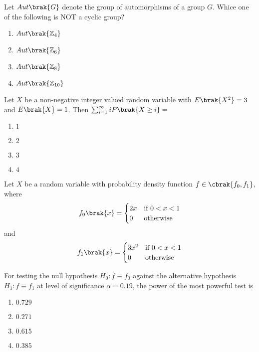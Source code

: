    \item Let $Aut\brak{G}$ denote the group of automorphisms of a group $G$. Whice one of the following is NOT a cyclic group?
	\hfill{}

	\begin{enumerate}
		\item $Aut\brak{\mathbb{Z}_4}$
		\item $Aut\brak{\mathbb{Z}_6}$
		\item $Aut\brak{\mathbb{Z}_8}$
		\item $Aut\brak{\mathbb{Z}_{10}}$
	\end{enumerate}

    \item Let $X$ be a non-negative integer valued random variable with $E\brak{X^2} = 3$ and $E\brak{X} = 1$. Then $\sum_{i = 1}^{\infty} iP\brak{X \geq i} = $
	\hfill{}

	\begin{enumerate}
		\item $1$
		\item $2$
		\item $3$
		\item $4$
	\end{enumerate}

    \item Let $X$ be a random variable with probability density function $f \in \cbrak{f_0, f_1}$, where
	\begin{align*}
		f_0\brak{x} = 
		\begin{cases}
			2x & \text{if } 0 < x < 1\\
			0 & \text{otherwise}\\
		\end{cases}
	\end{align*}
	and
	\begin{align*}
		f_1\brak{x} = 
		\begin{cases}
			3x^2 & \text{if } 0 < x < 1\\
			0 & \text{otherwise}\\
		\end{cases}
	\end{align*}

	For testing the null hypothesis $H_0 \colon f \equiv f_0$ against the alternative hypothesis $H_1\colon f \equiv f_1$ at level of significance $\alpha = 0.19$, the power of the most powerful test is

	\hfill{}
	\begin{enumerate}
		\item $0.729$ 
		\item $0.271$ 
		\item $0.615$ 
		\item $0.385$ 
	\end{enumerate}


